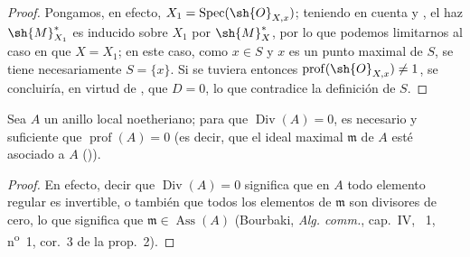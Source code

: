 \begin{proof}
Pongamos, en efecto, $X_1=\operatorname{Spec}(\sh{O}_{X,x})$;
teniendo en cuenta  y , el haz $\sh{M}_{X_1}^*$ es inducido sobre $X_1$ por $\sh{M}_X^*$, por lo que podemos limitarnos al caso en que $X=X_1$; en este caso, como $x\in S$ y $x$ es un punto maximal de $S$, se tiene necesariamente $S=\{x\}$.
Si se tuviera entonces $\operatorname{prof}(\sh{O}_{X,x})\neq1$, se concluiría, en virtud de , que $D=0$, lo que contradice la definición de $S$.
\end{proof}

\begin{proposition}[21.1.10]
\label{IV.21.1.10}
Sea $A$ un anillo local noetheriano;
para que $\operatorname{Div}(A)=0$, es necesario y suficiente que $\operatorname{prof}(A)=0$ (es decir, que el ideal maximal $\mathfrak{m}$ de $A$ esté asociado a $A$ \textup{())}.
\end{proposition}

\begin{proof}
En efecto, decir que $\operatorname{Div}(A)=0$ significa que en $A$ todo elemento regular es invertible, o también que todos los elementos de $\mathfrak{m}$ son divisores de cero, lo que significa que $\mathfrak{m}\in\operatorname{Ass}(A)$ (Bourbaki, \emph{Alg. comm.}, cap.~IV, \textsection~1, n\textsuperscript{o}~1, cor.~3 de la prop.~2).
\end{proof}
